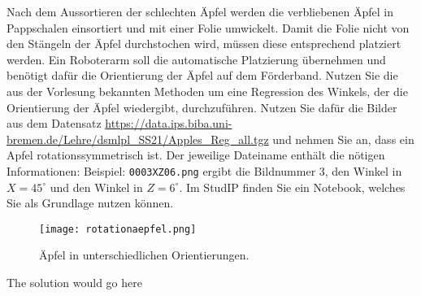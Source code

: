 \documentclass{oxmathproblems}
\begin{document}
\begin{questions}
\miquestion
Nach dem Aussortieren der schlechten Äpfel werden die verbliebenen Äpfel in Pappschalen einsortiert und mit einer Folie umwickelt. Damit die Folie nicht von den Stängeln der Äpfel durchstochen wird, müssen diese entsprechend platziert werden. Ein Roboterarm soll die automatische Platzierung übernehmen und benötigt dafür die Orientierung der Äpfel auf dem Förderband. Nutzen Sie die aus der Vorlesung bekannten Methoden um eine Regression des Winkels, der die Orientierung der Äpfel wiedergibt, durchzuführen. Nutzen Sie dafür die Bilder aus dem Datensatz \url{https://data.ips.biba.uni-bremen.de/Lehre/dsmlpl_SS21/Apples_Reg_all.tgz} und nehmen Sie an, dass ein Apfel rotationssymmetrisch ist. Der jeweilige Dateiname enthält die nötigen Informationen:
Beispiel: \texttt{0003\textunderscore X\textunderscore Z\textunderscore 06.png} ergibt die Bildnummer 3, den Winkel in $X = 45^{\circ}$ und den Winkel in $Z = 6^{\circ}$.
Im StudIP finden Sie ein Notebook, welches Sie als Grundlage nutzen können. 
\begin{figure}
    \centering
    \texttt{[image: rotationaepfel.png]}
    \caption{Äpfel in unterschiedlichen Orientierungen.}
    \label{fig:my_label}
\end{figure}


\begin{solution}
  The solution would go here
\end{solution}
\end{questions}
\end{document}
